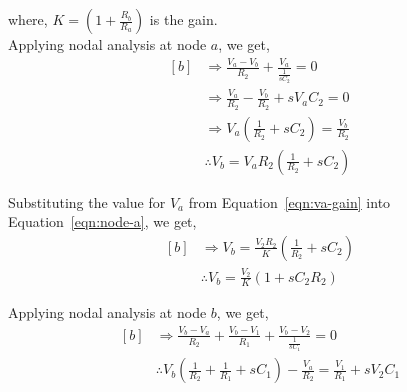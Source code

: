 \documentclass{lab_sheet}
\newcommand\ddfrac[2]{\frac{\displaystyle #1}{\displaystyle #2}}
\begin{document}
    where, $K=\left(1+\ddfrac{R_b}{R_a}\right)$ is the gain.\\
    Applying nodal analysis at node $a$, we get,
    \begin{equation}
        \begin{aligned}[b]
            &\Rightarrow \frac{V_a-V_b}{R_2}+\ddfrac{V_a}{\frac{1}{sC_2}}=0\\
            &\Rightarrow \frac{V_a}{R_2}-\frac{V_b}{R_2}+sV_aC_2=0\\
            &\Rightarrow V_a\left(\frac{1}{R_2}+sC_2\right)=\frac{V_b}{R_2}\\
            &\therefore V_b=V_aR_2\left(\frac{1}{R_2}+sC_2\right)
        \end{aligned}
        \label{eqn:node-a}
    \end{equation}

    Substituting the value for $V_a$ from Equation~\ref{eqn:va-gain} into Equation~\ref{eqn:node-a}, we get,
    \begin{equation}
        \begin{aligned}[b]
            &\Rightarrow V_b=\frac{V_2R_2}{K}\left(\frac{1}{R_2}+sC_2\right)\\
            & \therefore V_b = \frac{V_2}{K}\left(1+sC_2R_2\right)
        \end{aligned}
        \label{eqn:vb-v2}
    \end{equation}
    

    Applying nodal analysis at node $b$, we get,
    \begin{equation}
        \begin{aligned}[b]
            &\Rightarrow \frac{V_b-V_a}{R_2}+\frac{V_b-V_1}{R_1}+\ddfrac{V_b-V_2}{\frac{1}{sC_1}}=0\\
            &\therefore V_b \left(\frac{1}{R_2}+\frac{1}{R_1}+sC_1\right)-\frac{V_a}{R_2}=\frac{V_1}{R_1}+sV_2C_1
        \end{aligned}
        \label{eqn:node-b}
    \end{equation}
\end{document}

